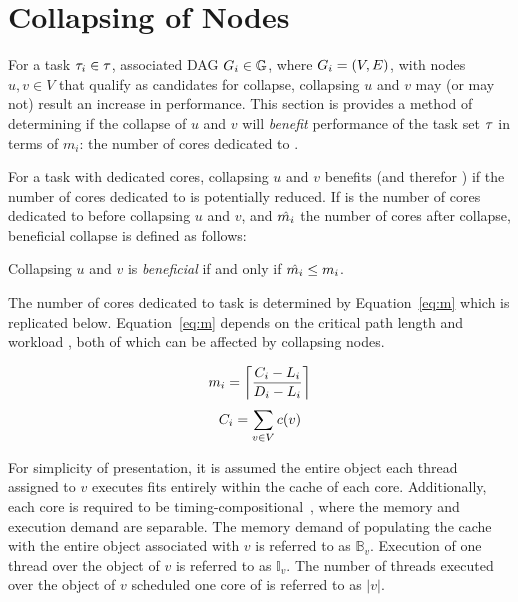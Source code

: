 \section{Collapsing of Nodes}
\label{sec:collapse-bound}

For a task ${\tau_{i} \in \tau{}}$, associated DAG
${\Dag{i} \in \dagset{}}$, where ${\Dag{i} = (V, E)}$, with nodes
${u,v \in V}$ that qualify as candidates for collapse, collapsing
${u}$ and ${v}$ may (or may not) result an increase in
performance. This section is provides a method of determining if the
collapse of ${u}$ and ${v}$ will \emph{benefit} performance of the
task set ${\tau{}}$ in terms of ${m_i}$: the number of cores
dedicated to .

For a task  with  dedicated cores, collapsing
${u}$ and ${v}$ benefits  (and therefor \tasks{}) if the
number of cores dedicated to  is potentially reduced. If
 is the number of cores dedicated to  before
collapsing ${u}$ and ${v}$, and ${\hat{m_{i}}}$ the number of
cores after collapse, beneficial collapse is defined as follows: 

\begin{definition}
  Collapsing ${u}$ and ${v}$ is \emph{beneficial} if and only if
  ${\hat{m_{i}} \le m_{i}}$.
\end{definition}

The number of cores dedicated to task  is determined by
Equation~\ref{eq:m} which is replicated below. Equation~\ref{eq:m}
depends on the critical path length  and workload
, both of which can be affected by collapsing nodes.

\begin{multicols}{2}
  \begin{equation*}
    m_i = \left\lceil
      \frac{\workload{i} - \criticalpathlen{i}}
           {\Deadline{i} - \criticalpathlen{i}}
    \right\rceil
  \end{equation*}
  \begin{equation*}
    \workload{i} = \sum_{v \in V} c(v)
  \end{equation*}
\end{multicols}

For simplicity of presentation, it is assumed the entire object each
thread assigned to ${v}$ executes fits entirely within the
cache of each core. Additionally, each core is required to be
timing-compositional~\addcite{}, where the memory and execution demand
are separable. The memory demand of populating the cache with the
entire object associated with ${v}$ is referred to as
${\mathbb{B}_v}$. Execution of one thread over the object of ${v}$ is
referred to as ${\mathbb{I}_v}$. The number of threads executed over
the object of ${v}$ scheduled one core of is referred to as
${|v|}$.

